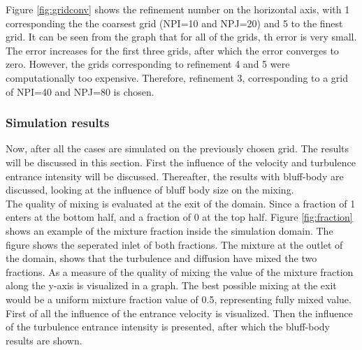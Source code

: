 \documentclass{CFD2017}
\begin{document}

Figure \ref{fig:gridconv} shows the refinement number on the horizontal axis, with 1 corresponding the the coarsest grid (NPI=10 and NPJ=20) and 5 to the finest grid. It can be seen from the graph that for all of the grids, th error is very small. The error increases for the first three grids, after which the error converges to zero. However, the grids corresponding to refinement 4 and 5 were computationally too expensive. Therefore, refinement 3, corresponding to a grid of NPI=40 and NPJ=80 is chosen.

\subsubsection{Simulation results}
Now, after all the cases are simulated on the previously chosen grid. The results will be discussed in this section. First the influence of the velocity and turbulence entrance intensity will be discussed. Thereafter, the results with bluff-body are discussed, looking at the influence of bluff body size on the mixing.\\
The quality of mixing is evaluated at the exit of the domain. Since a fraction of 1 enters at the bottom half, and a fraction of 0 at the top half. Figure \ref{fig:fraction} shows an example of the mixture fraction inside the simulation domain. The figure shows the seperated inlet of both fractions. The mixture at the outlet of the domain, shows that the turbulence and diffusion have mixed the two fractions. As a measure of the quality of mixing the value of the mixture fraction along the y-axis is visualized in a graph. The best possible mixing at the exit would be a uniform mixture fraction value of 0.5, representing fully mixed value.\\
First of all the influence of the entrance velocity is visualized. Then the influence of the turbulence entrance intensity is presented, after which the bluff-body results are shown.


\newpage
{}

\newpage
{}
\newpage
{}
\end{document}
